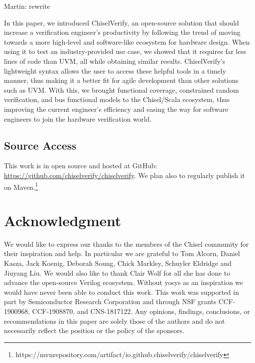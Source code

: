 \documentclass[conference]{IEEEtran}
\newcommand{\martin}[1]{{\color{blue} Martin: #1}}
\begin{document}
\martin{rewrite}

In this paper, we introduced ChiselVerify, an open-source solution that should increase a verification engineer's productivity by following the trend of moving towards a more high-level and software-like ecosystem for hardware design. 
When using it to test an industry-provided use case, we showed that it requires far less lines of code than UVM, all while obtaining similar results.
ChiselVerify's lightweight syntax allows the user to access these helpful tools in a timely manner, thus making it a better fit for agile development than other solutions such as UVM.
With this, we brought functional coverage, constrained random verification, and bus functional models to the Chisel/Scala ecosystem, thus improving the current engineer's efficiency and easing the way for software engineers to join the hardware verification world.

\subsection*{Source Access}

This work is in open source and hosted at GitHub:\\ \url{https://github.com/chiselverify/chiselverify}.
We plan also to regularly publish it on Maven.\footnote{https://mvnrepository.com/artifact/io.github.chiselverify/chiselverify}


\section*{Acknowledgment}
We would like to express our thanks to the members of the Chisel community for their 
inspiration and help. %
In particular we are grateful to Tom Alcorn, Daniel Kasza, Jack Koenig, Deborah Soung,
Chick Markley, Schuyler Eldridge and Jiuyang Liu.
We would also like to thank Clair Wolf for all she has done to advance the open-source Verilog ecosystem.
Without yosys as an inspiration we would have never been able to conduct this work.
This work was supported in part by Semiconductor Research Corporation and through NSF grants CCF-1900968, CCF-1908870, and CNS-1817122.
Any opinions, findings, conclusions, or recommendations in this
paper are solely those of the authors and do not necessarily
reflect the position or the policy of the sponsors.



\end{document}
